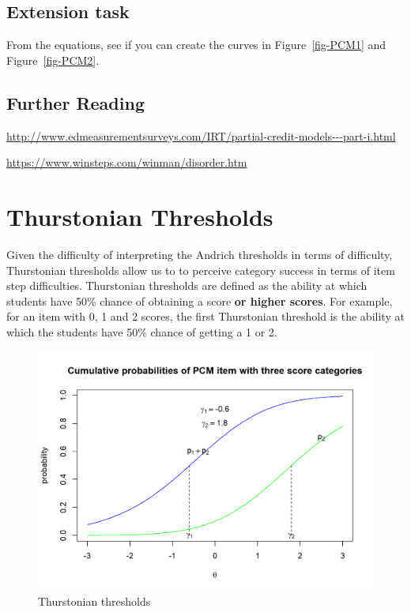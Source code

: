 \documentclass[
  letterpaper,
  DIV=11,
  numbers=noendperiod]{scrreprt}
\begin{document}
\hypertarget{extension-task}{%
\section{Extension task}\label{extension-task}}

From the equations, see if you can create the curves in
Figure~\ref{fig-PCM1} and Figure~\ref{fig-PCM2}.

\hypertarget{further-reading}{%
\section{Further Reading}\label{further-reading}}

\url{http://www.edmeasurementsurveys.com/IRT/partial-credit-models---part-i.html}

\url{https://www.winsteps.com/winman/disorder.htm}

\hypertarget{thurstonian-thresholds}{%
\chapter{Thurstonian Thresholds}\label{thurstonian-thresholds}}

Given the difficulty of interpreting the Andrich thresholds in terms of
difficulty, Thurstonian thresholds allow us to to perceive category
success in terms of item step difficulties. Thurstonian thresholds are
defined as the ability at which students have 50\% chance of obtaining a
score \textbf{or higher scores}. For example, for an item with 0, 1 and
2 scores, the first Thurstonian threshold is the ability at which the
students have 50\% chance of getting a 1 or 2.

\begin{figure}

{\centering \includegraphics{images/PCM4-1.png}

}

\caption{\label{fig-PCM4-1}Thurstonian thresholds}

\end{figure}
\end{document}
